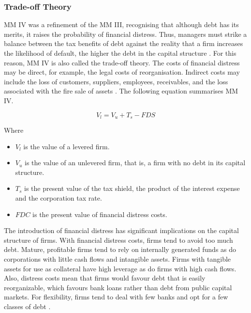 \documentclass[a4paper,nobind]{templates/ociamthesis}
\providecommand{\tightlist}{%
  \setlength{\itemsep}{0pt}\setlength{\parskip}{0pt}}
\begin{document}
\hypertarget{trade-off-theory}{%
\subsubsection{Trade-off Theory}\label{trade-off-theory}}

\noindent MM IV was a refinement of the MM III, recognising that although debt has its merits, it raises the probability of financial distress. Thus, managers must strike a balance between the tax benefits of debt against the reality that a firm increases the likelihood of default, the higher the debt in the capital structure \autocite{de2011firms}. For this reason, MM IV is also called the trade-off theory. The costs of financial distress may be direct, for example, the legal costs of reorganisation. Indirect costs may include the loss of customers, suppliers, employees, receivables, and the loss associated with the fire sale of assets \autocite{ehrhardt2016corporate}. The following equation summarises MM IV.

\begin{equation}
V_{l} = V_{u} + T_{s} - FDS
\end{equation}

Where

\begin{itemize}
\tightlist
\item
  \(V_l\) is the value of a levered firm.
\item
  \(V_u\) is the value of an unlevered firm, that is, a firm with no debt in its capital structure.
\item
  \(T_s\) is the present value of the tax shield, the product of the interest expense and the corporation tax rate.
\item
  \(FDC\) is the present value of financial distress costs.
\end{itemize}

The introduction of financial distress has significant implications on the capital structure of firms. With financial distress costs, firms tend to avoid too much debt. Mature, profitable firms tend to rely on internally generated funds as do corporations with little cash flows and intangible assets. Firms with tangible assets for use as collateral have high leverage as do firms with high cash flows. Also, distress costs mean that firms would favour debt that is easily reorganizable, which favours bank loans rather than debt from public capital markets. For flexibility, firms tend to deal with few banks and opt for a few classes of debt \autocite{ehrhardt2016corporate}.
\end{document}
